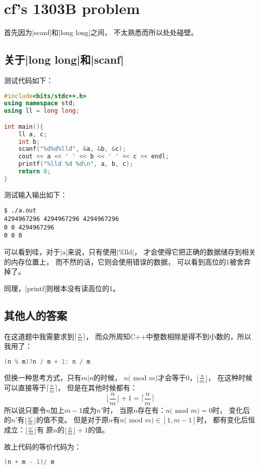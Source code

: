 \section{cf's 1303B problem}

首先因为\vb|scanf|和\vb|long long|之间，
不太熟悉而所以处处碰壁。

\subsection{关于\vb|long long|和\vb|scanf|}
测试代码如下：
\begin{lstlisting}[language=C++]
#include<bits/stdc++.h>
using namespace std;
using ll = long long;

int main(){
    ll a, c;
    int b;
    scanf("%d%d%lld", &a, &b, &c);
    cout << a << ' ' << b << ' ' << c << endl;
    printf("%lld %d %d\n", a, b, c);
    return 0;
}
\end{lstlisting}

测试输入输出如下：
\begin{lstlisting}
$ ./a.out
4294967296 4294967296 4294967296
0 0 4294967296
0 0 0
\end{lstlisting}

可以看到哇，对于\vb|a|来说，只有使用\vb|\%lld|，
才会使得它把正确的数据储存到相关的内存位置上，
而不然的话，它则会使用错误的数据，
可以看到高位的1被舍弃掉了。

同理，\vb|printf|则根本没有读高位的1。

\subsection{其他人的答案}
在这道题中我需要求到$\lceil\frac{n}{m}\rceil$，
而众所周知C++中整数相除是得不到小数的，所以我用了：
\begin{lstlisting}[language=C++]
(n % m)?n / m + 1: n / m
\end{lstlisting}

但换一种思考方式，只有$m|n$的时候，
$n($ mod $m)$才会等于$0$，$\lfloor\frac{n}{m}\rfloor$，
在这种时候可以直接等于$\lceil\frac{n}{m}\rceil$，
但是在其他时候都有：
$$\lfloor\frac{n}{m}\rfloor + 1 = \lceil\frac{n}{m}\rceil$$
所以说只要令$n$加上$m-1$成为$n'$时，
当原$n$存在有：$n($ mod $m) = 0$时，
变化后的$n'$有$\lfloor\frac{n'}{m}\rfloor$的值不变。
但是对于原$n$有$n($ mod $m)\in [1, m-1]$时，
都有变化后恒成立：$\lfloor\frac{n'}{m}\rfloor$有
原$n$的$\lfloor\frac{n}{m}\rfloor + 1$的值。

故上代码的等价代码为：
\begin{lstlisting}[language=C++]
(n + m - 1)/ m
\end{lstlisting}


